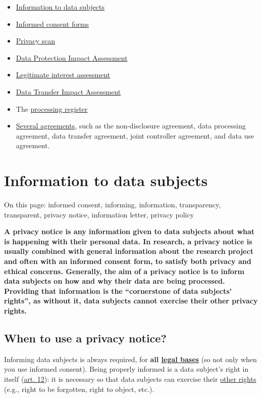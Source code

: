 \documentclass[
]{book}
\providecommand{\tightlist}{%
  \setlength{\itemsep}{0pt}\setlength{\parskip}{0pt}}
\begin{document}
\begin{itemize}
\tightlist
\item
  \protect\hyperlink{privacy-notices}{Information to data subjects}
\item
  \protect\hyperlink{informed-consent-forms}{Informed consent forms}
\item
  \protect\hyperlink{privacy-scan}{Privacy scan}
\item
  \protect\hyperlink{dpia}{Data Protection Impact Assessment}
\item
  \protect\hyperlink{legitimate-interest-assessment}{Legitimate interest assessment}
\item
  \protect\hyperlink{dtia}{Data Transfer Impact Assessment}
\item
  The \protect\hyperlink{processing-register}{processing register}
\item
  \protect\hyperlink{agreements}{Several agreements}, such as the non-disclosure agreement, data processing
  agreement, data transfer agreement, joint controller agreement, and data use
  agreement.
\end{itemize}

\hypertarget{privacy-notices}{%
\section{Information to data subjects}\label{privacy-notices}}

On this page: informed consent, informing, information, transparency,
transparent, privacy notice, information letter, privacy policy

\textbf{A privacy notice is any information given to data subjects about what is
happening with their personal data. In research, a privacy notice is usually
combined with general information about the research project and often with an
informed consent form, to satisfy both privacy and ethical concerns. Generally,
the aim of a privacy notice is to inform data subjects on how and why their
data are being processed. Providing that information is the ``cornerstone of
data subjects' rights'', as without it, data subjects cannot exercise their other
privacy rights.}

\hypertarget{when-to-use-a-privacy-notice}{%
\subsection{When to use a privacy notice?}\label{when-to-use-a-privacy-notice}}

Informing data subjects is always required, for \textbf{all \protect\hyperlink{legal-basis}{legal bases}}
(so not only when you use informed consent). Being properly informed is a data
subject's right in itself (\href{https://gdpr-info.eu/art-12-gdpr/}{art. 12}):
it is necessary so that data subjects can exercise their \protect\hyperlink{data-subject-rights}{other rights}
(e.g., right to be forgotten, right to object, etc.).
\end{document}
